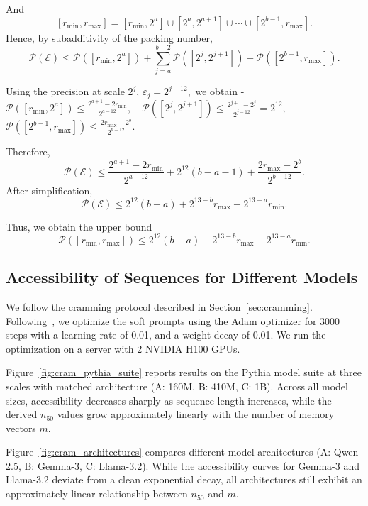 And
$$
[r_{\min}, r_{\max}]=
[r_{\min},2^a]
\cup
[2^a,2^{a+1}]
\cup \cdots \cup
[2^{b-1},r_{\max}].
$$
Hence, by subadditivity of the packing number,
$$
\mathcal P(\mathcal E)
\le
\mathcal P([r_{\min},2^a])
+\sum_{j=a}^{b-2}\mathcal P([2^j,2^{j+1}])
+\mathcal P([2^{b-1},r_{\max}]).
$$

Using the precision at scale $2^j$,
$
\varepsilon_j = 2^{j-12},
$
we obtain
 - $
\mathcal P([r_{\min},2^a])
\le
\frac{2^{a+1}-2r_{\min}}{2^{a-12}},
$
 - $
\mathcal P([2^j,2^{j+1}])
\le
\frac{2^{j+1}-2^j}{2^{j-12}}
=2^{12},
$
 - $
\mathcal P([2^{b-1},r_{\max}])
\le
\frac{2r_{\max}-2^b}{2^{b-12}}.
$

Therefore,
$$
\mathcal P(\mathcal E)
\le
\frac{2^{a+1}-2r_{\min}}{2^{a-12}}
+
2^{12}(b-a-1)
+
\frac{2r_{\max}-2^b}{2^{b-12}}.
$$
After simplification,
$$
\mathcal P(\mathcal E)
\le
2^{12}(b-a)+2^{13-b}r_{\max}-2^{13-a}r_{\min}.
$$

Thus, we obtain the upper bound
$$
\boxed{
\mathcal P([r_{\min},r_{\max}])
\le
2^{12}(b-a)+2^{13-b}r_{\max}-2^{13-a}r_{\min}
}.
$$

\subsection{Accessibility of Sequences for Different Models}
We follow the cramming protocol described in Section~\ref{sec:cramming}. Following~\cite{kuratov-etal-2025-cramming}, we optimize the soft prompts using the Adam optimizer for 3000 steps with a learning rate of 0.01, and a weight decay of 0.01. We run the optimization on a server with 2 NVIDIA H100 GPUs.

Figure~\ref{fig:cram_pythia_suite} reports results on the Pythia model suite at three scales with matched architecture (A: 160M, B: 410M, C: 1B). Across all model sizes, accessibility decreases sharply as sequence length increases, while the derived $n_{50}$ values grow approximately linearly with the number of memory vectors $m$.

Figure~\ref{fig:cram_architectures} compares different model architectures (A: Qwen-2.5, B: Gemma-3, C: Llama-3.2). While the accessibility curves for Gemma-3 and Llama-3.2 deviate from a clean exponential decay, all architectures still exhibit an approximately linear relationship between $n_{50}$ and $m$.

